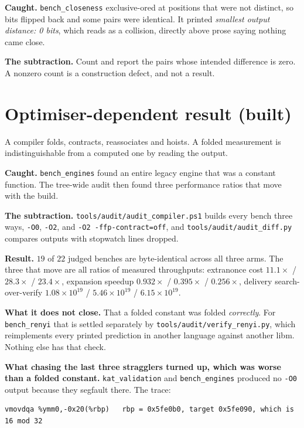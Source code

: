 \textbf{Caught.} \texttt{bench\_closeness} exclusive-ored at positions that were not distinct, so bits flipped back and some pairs were identical. It printed \emph{smallest output distance: 0 bits}, which reads as a collision, directly above prose saying nothing came close.

\textbf{The subtraction.} Count and report the pairs whose intended difference is zero. A nonzero count is a construction defect, and not a result.

\section{Optimiser-dependent result (built)}

A compiler folds, contracts, reassociates and hoists. A folded measurement is indistinguishable from a computed one by reading the output.

\textbf{Caught.} \texttt{bench\_engines} found an entire legacy engine that was a constant function. The tree-wide audit then found three performance ratios that move with the build.

\textbf{The subtraction.} \texttt{tools/\allowbreak{}audit/\allowbreak{}audit\_compiler.ps1} builds every bench three ways, \texttt{-O0}, \texttt{-O2}, and \texttt{-O2 -ffp-contract=off}, and \texttt{tools/\allowbreak{}audit/\allowbreak{}audit\_diff.py} compares outputs with stopwatch lines dropped.

\textbf{Result.} \(19\) of \(22\) judged benches are byte-identical across all three arms. The three that move are all ratios of measured throughputs: extranonce cost \(11.1\times\) / \(28.3\times\) / \(23.4\times\), expansion speedup \(0.932\times\) / \(0.395\times\) / \(0.256\times\), delivery search-over-verify \(1.08 \times 10^{19}\) / \(5.46 \times 10^{19}\) / \(6.15 \times 10^{19}\).

\textbf{What it does not close.} That a folded constant was folded \emph{correctly}. For \texttt{bench\_renyi} that is settled separately by \texttt{tools/\allowbreak{}audit/\allowbreak{}verify\_renyi.py}, which reimplements every printed prediction in another language against another libm. Nothing else has that check.

\textbf{What chasing the last three stragglers turned up, which was worse than a folded constant.} \texttt{kat\_validation} and \texttt{bench\_engines} produced no \texttt{-O0} output because they segfault there. The trace:

\begin{verbatim}
vmovdqa %ymm0,-0x20(%rbp)   rbp = 0x5fe0b0, target 0x5fe090, which is 16 mod 32
\end{verbatim}

